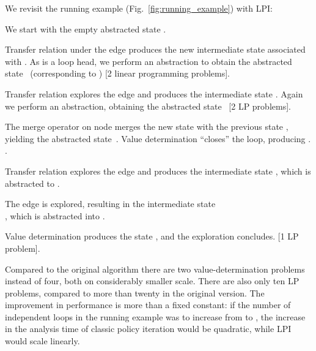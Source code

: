 \documentclass{llncs}
\begin{document}
\begin{example}
    We revisit the running example (Fig.~\ref{fig:running_example}) with LPI:
    \begin{compactenum}
        \item We start with the empty abstracted state .
        \item Transfer relation under the edge  produces the new
            intermediate state  associated with .
            As  is a loop head, we perform an abstraction to obtain the
            abstracted
            state~
            (corresponding to ) [2 linear programming problems].
        \item Transfer relation explores the edge  and produces
            the intermediate state .
            Again we perform an abstraction, obtaining the abstracted
            state~
             [2 LP problems].
        \item The merge operator on node  merges the new state 
            with the previous state , yielding the abstracted
            state~.
            Value determination ``closes'' the loop, producing
            .
            \newline [1 LP problem].
        \item Transfer relation explores the edge  and produces
            the intermediate state ,
            which is abstracted
            to \newline 
            [2 LP problems].
        \item The edge  is explored, resulting in the
            intermediate state\\ , which is
            abstracted
            into \newline 
            [2 LP problems].
        \item Value determination produces the state
            ,
            and the exploration concludes. [1 LP problem].
    \end{compactenum}

    Compared to the original algorithm there are two value-determination
    problems instead of four, both on considerably smaller scale.
    There are also only ten LP problems, compared to more than
    twenty in the original version.
    The improvement in performance is more than a fixed constant: if the number
    of independent loops in the running example was to increase from  to , the increase
    in the analysis time of classic policy iteration would be quadratic,
    while LPI would scale linearly.
\end{example}
\end{document}
